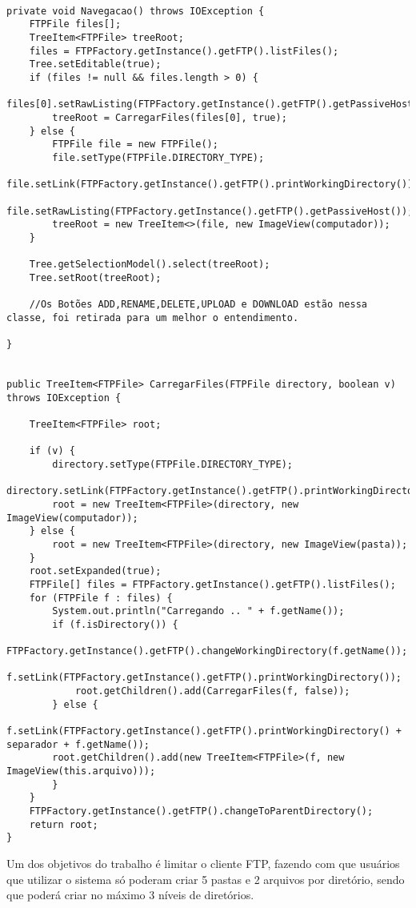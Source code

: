 \documentclass[12pt]{article}
\begin{document}
\begin{lstlisting}

private void Navegacao() throws IOException {
	FTPFile files[];
	TreeItem<FTPFile> treeRoot;
	files = FTPFactory.getInstance().getFTP().listFiles();
	Tree.setEditable(true);
	if (files != null && files.length > 0) {
		files[0].setRawListing(FTPFactory.getInstance().getFTP().getPassiveHost());
		treeRoot = CarregarFiles(files[0], true);
	} else {
		FTPFile file = new FTPFile();
		file.setType(FTPFile.DIRECTORY_TYPE);
		file.setLink(FTPFactory.getInstance().getFTP().printWorkingDirectory());
		file.setRawListing(FTPFactory.getInstance().getFTP().getPassiveHost());
		treeRoot = new TreeItem<>(file, new ImageView(computador));
	}
	
	Tree.getSelectionModel().select(treeRoot);	
	Tree.setRoot(treeRoot);
	
	//Os Botões ADD,RENAME,DELETE,UPLOAD e DOWNLOAD estão nessa classe, foi retirada para um melhor o entendimento.

}


public TreeItem<FTPFile> CarregarFiles(FTPFile directory, boolean v) throws IOException {
	
	TreeItem<FTPFile> root;

	if (v) {
		directory.setType(FTPFile.DIRECTORY_TYPE);
		directory.setLink(FTPFactory.getInstance().getFTP().printWorkingDirectory());
		root = new TreeItem<FTPFile>(directory, new ImageView(computador));
    } else {
		root = new TreeItem<FTPFile>(directory, new ImageView(pasta));
	}
	root.setExpanded(true);
	FTPFile[] files = FTPFactory.getInstance().getFTP().listFiles();
	for (FTPFile f : files) {
		System.out.println("Carregando .. " + f.getName());
	    if (f.isDirectory()) {
			FTPFactory.getInstance().getFTP().changeWorkingDirectory(f.getName());
			f.setLink(FTPFactory.getInstance().getFTP().printWorkingDirectory());
			root.getChildren().add(CarregarFiles(f, false));
		} else {
		f.setLink(FTPFactory.getInstance().getFTP().printWorkingDirectory() + separador + f.getName());
		root.getChildren().add(new TreeItem<FTPFile>(f, new ImageView(this.arquivo)));
		}
	}
	FTPFactory.getInstance().getFTP().changeToParentDirectory(); 
	return root;
}

\end{lstlisting}

Um dos objetivos do trabalho é limitar o cliente FTP, fazendo com que usuários que utilizar o sistema só poderam criar 5 pastas e 2 arquivos por diretório, sendo que poderá criar no máximo 3 níveis de diretórios.
\end{document}
